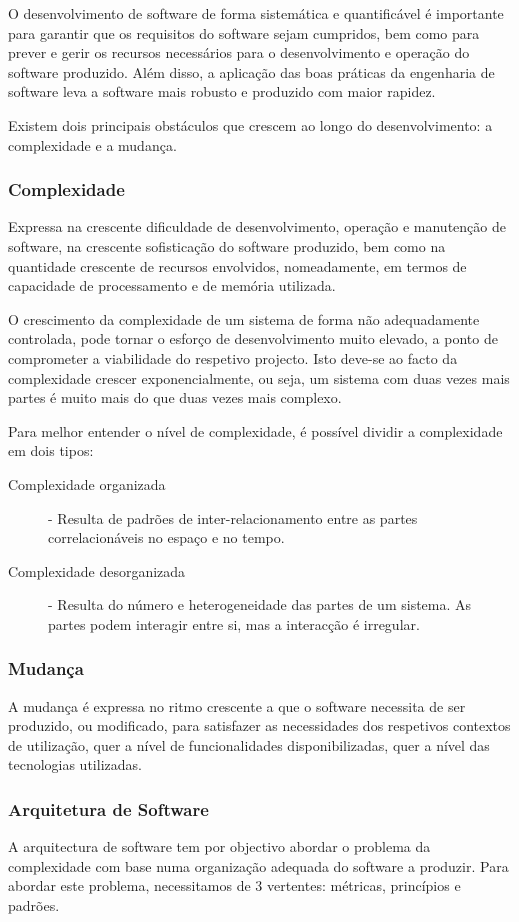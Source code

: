 \documentclass[a4paper,12pt]{article}
\begin{document}
O desenvolvimento de software de forma sistemática e quantificável é importante para garantir que os requisitos do software sejam cumpridos, bem como para prever e gerir os recursos necessários para o desenvolvimento e operação do software produzido.
Além disso, a aplicação das boas práticas da engenharia de software leva a software mais robusto e produzido com maior rapidez.

Existem dois principais obstáculos que crescem ao longo do desenvolvimento: a complexidade e a mudança.
\subsubsection{Complexidade}
Expressa na crescente dificuldade de desenvolvimento, operação e manutenção de software, na crescente sofisticação do software produzido, bem como na quantidade crescente de recursos envolvidos, nomeadamente, em termos de capacidade de processamento e de memória utilizada.

O crescimento da complexidade de um sistema de forma não adequadamente controlada, pode tornar o esforço de desenvolvimento muito elevado, a ponto de comprometer a viabilidade do respetivo projecto. Isto deve-se ao facto da complexidade crescer exponencialmente, ou seja, um sistema com duas vezes mais partes é muito mais do que duas vezes mais complexo.

Para melhor entender o nível de complexidade, é possível dividir a complexidade em dois tipos:
\begin{description}
	\item[Complexidade organizada] - Resulta de padrões de inter-relacionamento entre as partes correlacionáveis no espaço e no tempo. 
	\item[Complexidade desorganizada] - Resulta do número e heterogeneidade das partes de um sistema. As partes podem interagir entre si, mas a interacção é irregular.
\end{description}

\subsubsection{Mudança}
A mudança é expressa no ritmo crescente a que o software necessita de ser produzido, ou modificado, para satisfazer as necessidades dos respetivos contextos de utilização, quer a nível de funcionalidades disponibilizadas, quer a nível das tecnologias utilizadas.

\subsubsection{Arquitetura de Software}
A arquitectura de software tem por objectivo abordar o problema da complexidade com base numa organização adequada do software a produzir.
Para abordar este problema, necessitamos de 3 vertentes: métricas, princípios e padrões.
\end{document}
